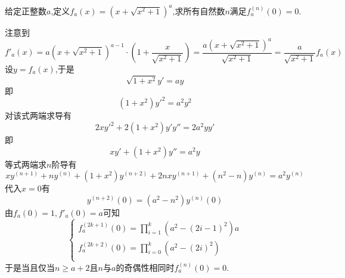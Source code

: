 \documentclass{ctexart}
\begin{document}
\begin{problem}[9.(8\songti{分})]
    给定正整数$a$,定义$f_a(x)=\left(x+\sqrt{x^2+1}\right)^a$,求所有自然数$n$满足$f_a^{(n)}(0)=0$.
\end{problem}
\begin{solution}
    注意到$$f'_a(x)=a\left(x+\sqrt{x^2+1}\right)^{a-1}\cdot\left(1+\dfrac{x}{\sqrt{x^2+1}}\right)=\dfrac{a\left(x+\sqrt{x^2+1}\right)^a}{\sqrt{x^2+1}}=\dfrac{a}{\sqrt{x^2+1}}f_a(x)$$
    设$y=f_a(x)$,于是$$\sqrt{1+x^2}y'=ay$$
    即$$\left(1+x^2\right)y'^2=a^2y^2$$
    对该式两端求导有$$2xy'^2+2\left(1+x^2\right)y'y''=2a^2yy'$$
    即$$xy'+\left(1+x^2\right)y''=a^2y$$
    等式两端求$n$阶导有$$xy^{(n+1)}+ny^{(n)}+\left(1+x^2\right)y^{(n+2)}+2nxy^{(n+1)}+\left(n^2-n\right)y^{(n)}=a^2y^{(n)}$$
    代入$x=0$有$$y^{(n+2)}(0)=\left(a^2-n^2\right)y^{(n)}(0)$$
    由$f_a(0)=1,f'_a(0)=a$可知
    $$\left\{\begin{array}{l}
        f_a^{(2k+1)}(0)=\prod_{i=1}^{k}\left(a^2-\left(2i-1\right)^2\right)a \\
        f_a^{(2k+2)}(0)=\prod_{i=0}^{k}\left(a^2-\left(2i\right)^2\right) \\
    \end{array}\right.$$
    于是当且仅当$n\geqslant a+2$且$n$与$a$的奇偶性相同时$f_a^{(n)}(0)=0$.
\end{solution}
\end{document}
